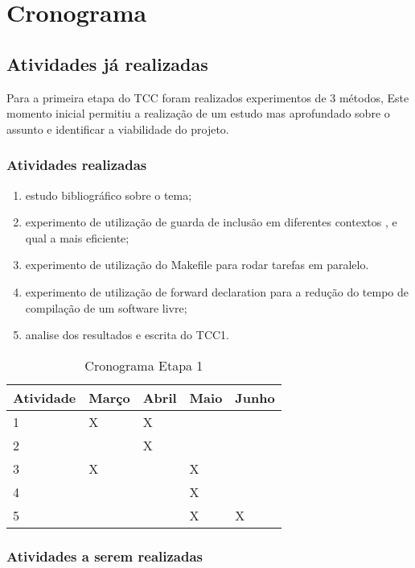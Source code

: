\chapter[Cronograma]{Cronograma}

\section{Atividades já realizadas}

Para a primeira etapa do TCC foram realizados experimentos de 3 métodos,
 Este momento inicial permitiu a realização de um estudo mas aprofundado
 sobre o assunto e identificar a viabilidade do projeto.


\subsection{Atividades realizadas}

\begin{enumerate}
	\item		estudo bibliográfico sobre o tema;
	\item		experimento de utilização de guarda de inclusão em diferentes contextos , e qual a mais eficiente;
	\item		experimento de utilização do Makefile para rodar tarefas em paralelo.
	\item		experimento de utilização de forward declaration para a redução do tempo de compilação de um software livre;
	\item		analise dos resultados e escrita do TCC1.
\end{enumerate}

\begin{table}[h]
\centering
\begin{tabular}{|l|l|l|l|l|}
Atividade & Março & Abril & Maio & Junho \\ \hline
1         & X     & X     &      &       \\ \hline
2         &       & X     &      &       \\ \hline
3         & X     &       & X    &       \\ \hline
4         &       &       & X    &       \\ \hline
5         &       &       & X    & X     \\ \hline
\end{tabular} 
\caption{Cronograma Etapa 1}
\label{cronograma1}
\end{table}

\subsection {Atividades a serem realizadas}

